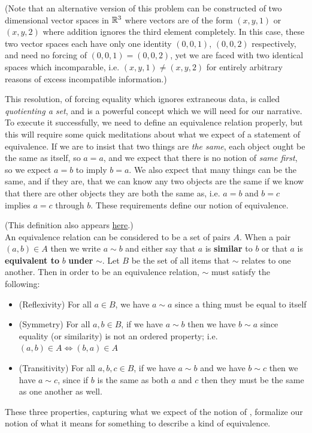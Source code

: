 \documentclass[11pt]{article}
\begin{document}
(Note that an alternative version of this problem can be constructed of two dimensional vector spaces in $\mathbb{R}^3$ where vectors are of the form $(x,y,1)$ or $(x,y,2)$ where addition ignores the third element completely. In this case, these two vector spaces each have only one identity $(0,0,1)$, $(0,0,2)$ respectively, and need no forcing of $(0,0,1) = (0,0,2)$, yet we are faced with two identical spaces which incomparable, i.e. $(x,y,1) \neq (x,y,2)$ for entirely arbitrary reasons of excess incompatible information.)

This resolution, of forcing equality which ignores extraneous data, is called \emph{quotienting a set}, and is a powerful concept which we will need for our narrative. To execute it successfully, we need to define an equivalence relation properly, but this will require some quick meditations about what we expect of a statement of equivalence. If we are to insist that two things are \emph{the same}, each object ought be the same as itself, so $a = a$, and we expect that there is no notion of \emph{same first}, so we expect $a = b$ to imply $b = a$. We also expect that many things can be the same, and if they are, that we can know any two objects are the same if we know that there are other objects they are both the same as, i.e. $a = b$ and $b = c$ implies $a = c$ through $b$. These requirements define our notion of equivalence.

\begin{definition}
(This definition also appears \hyperref[def:EquivalenceRelation]{here}.) \\
An equivalence relation can be considered to be a set of pairs $A$. When a pair $(a,b) \in A$ then we write $a \sim b$ and either say that $a$ is \textbf{similar} to $b$ or that $a$ is \textbf{equivalent to} $b$ \textbf{under} $\sim$. Let $B$ be the set of all items that $\sim$ relates to one another. Then in order to be an equivalence relation, $\sim$ must satisfy the following: \begin{itemize}
\item (Reflexivity) For all $a \in B$, we have $a \sim a$ since a thing must be equal to itself
\item (Symmetry) For all $a,b \in B$, if we have $a \sim b$ then we have $b \sim a$ since equality (or similarity) is not an ordered property; i.e. $(a,b) \in A \iff (b,a) \in A$
\item (Transitivity) For all $a,b,c \in B$, if we have $a \sim b$ and we have $b \sim c$ then we have $a \sim c$, since if $b$ is the same as both $a$ and $c$ then they must be the same as one another as well.
\end{itemize}
These three properties, capturing what we expect of the notion of , formalize our notion of what it means for something to describe a kind of equivalence.
\end{definition}
\end{document}
